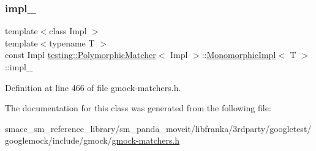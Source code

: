 \subsubsection{\texorpdfstring{impl\+\_\+}{impl\_}}
{\footnotesize\ttfamily template$<$class Impl $>$ \\
template$<$typename T $>$ \\
const Impl \hyperlink{classtesting_1_1PolymorphicMatcher}{testing\+::\+Polymorphic\+Matcher}$<$ Impl $>$\+::\hyperlink{classtesting_1_1PolymorphicMatcher_1_1MonomorphicImpl}{Monomorphic\+Impl}$<$ T $>$\+::impl\+\_\+\hspace{0.3cm}{\ttfamily [private]}}



Definition at line 466 of file gmock-\/matchers.\+h.



The documentation for this class was generated from the following file\+:\begin{DoxyCompactItemize}
\item 
smacc\+\_\+sm\+\_\+reference\+\_\+library/sm\+\_\+panda\+\_\+moveit/libfranka/3rdparty/googletest/googlemock/include/gmock/\hyperlink{gmock-matchers_8h}{gmock-\/matchers.\+h}\end{DoxyCompactItemize}
